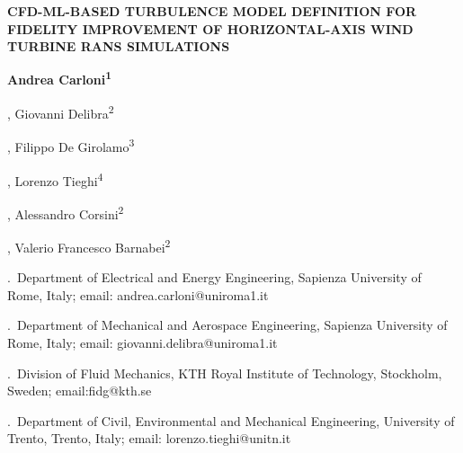 \documentclass[12pt,a4paper]{article}
\begin{document}
\begin{center}
  {\arialnarrow\bfseries\fontsize{14}{17}\selectfont
   \MakeUppercase{CFD-ML-Based Turbulence Model Definition for Fidelity
   Improvement of Horizontal-Axis Wind Turbine RANS Simulations}\par}
  \vspace{6pt}
  {\arialfont\bfseries\fontsize{12}{14}\selectfont Andrea Carloni\textsuperscript{1}\par , Giovanni Delibra\textsuperscript{2}\par, Filippo De Girolamo\textsuperscript{3}\par, Lorenzo Tieghi\textsuperscript{4}\par, Alessandro Corsini\textsuperscript{2}\par, Valerio Francesco Barnabei\textsuperscript{2}\par}
  \vspace{2pt}
  {\fontsize{12}{14}.\ Department of Electrical and Energy Engineering, Sapienza University
   of Rome, Italy; email: andrea.carloni@uniroma1.it\par}
  {\fontsize{12}{14}.\ Department of Mechanical and Aerospace Engineering, Sapienza University
   of Rome, Italy; email: giovanni.delibra@uniroma1.it\par}
  {\fontsize{12}{14}.\ Division of Fluid Mechanics, KTH Royal Institute of Technology, Stockholm, Sweden; email:fidg@kth.se\par}
  {\fontsize{12}{14}.\ Department of Civil, Environmental and Mechanical Engineering, University of Trento, Trento, Italy; email: lorenzo.tieghi@unitn.it\par}

\end{center}
\vspace{6pt}











\end{document}
